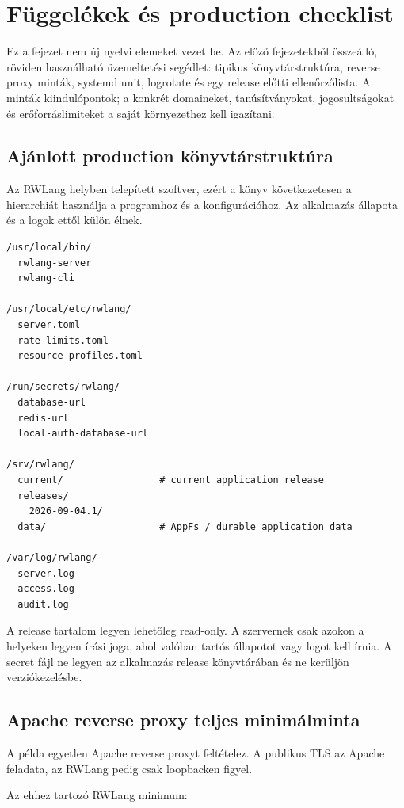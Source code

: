 \chapter{Függelékek és production checklist}

Ez a fejezet nem új nyelvi elemeket vezet be. Az előző fejezetekből összeálló, röviden használható üzemeltetési segédlet: tipikus könyvtárstruktúra, reverse proxy minták, systemd unit, logrotate és egy release előtti ellenőrzőlista. A minták kiindulópontok; a konkrét domaineket, tanúsítványokat, jogosultságokat és erőforráslimiteket a saját környezethez kell igazítani.

\section{Ajánlott production könyvtárstruktúra}

Az RWLang helyben telepített szoftver, ezért a könyv következetesen a  hierarchiát használja a programhoz és a konfigurációhoz. Az alkalmazás állapota és a logok ettől külön élnek.

\begin{lstlisting}
/usr/local/bin/
  rwlang-server
  rwlang-cli

/usr/local/etc/rwlang/
  server.toml
  rate-limits.toml
  resource-profiles.toml

/run/secrets/rwlang/
  database-url
  redis-url
  local-auth-database-url

/srv/rwlang/
  current/                 # current application release
  releases/
    2026-09-04.1/
  data/                    # AppFs / durable application data

/var/log/rwlang/
  server.log
  access.log
  audit.log
\end{lstlisting}

A release tartalom legyen lehetőleg read-only. A szervernek csak azokon a helyeken legyen írási joga, ahol valóban tartós állapotot vagy logot kell írnia. A secret fájl ne legyen az alkalmazás release könyvtárában és ne kerüljön verziókezelésbe.

\section{Apache reverse proxy teljes minimálminta}

A példa egyetlen Apache reverse proxyt feltételez. A publikus TLS az Apache feladata, az RWLang pedig csak loopbacken figyel.

Az ehhez tartozó RWLang minimum:

